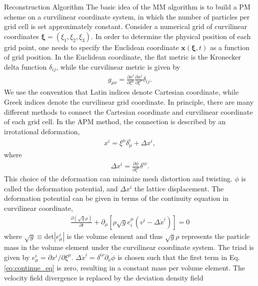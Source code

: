 \begin{section}{Reconstruction Algorithm}
  \label{sec:reconstruction}
The basic idea of the MM algorithm is to build a PM scheme on a curvilinear 
coordinate system, in which the number of particles per grid cell is 
set approximately constant. 
Consider a numerical grid of curvilinear coordinates 
$\bm{\xi}=\left(\xi_1,\xi_2,\xi_3\right)$. 
In order to determine the physical position of each grid point, one needs to 
specify the Euclidean coordinate $\bm{x}(\bm{\xi},t)$ as a function of grid 
position. In the Euclidean coordinate, the flat metric is the Kronecker 
delta function $\delta_{ij}$, while the curvilinear metric is given by
\begin{align}
    g_{\mu\nu}=\frac{\partial x^i}{\partial \xi ^\mu} \frac{\partial x^j}{\partial \xi ^\nu}\delta_{ij}.
\end{align}
We use the convention that Latin indices denote Cartesian coordinate, 
while Greek indices denote the curvilinear grid coordinate.
In principle, there are many different methods to connect the Cartesian 
coordinate and curvilinear coordinate of each grid cell. In the APM method, 
the connection is described by an irrotational deformation,
\begin{align}
    x^i=\xi ^\mu \delta ^i _\mu + \Delta x^i,
\end{align}
where
\begin{align}
 \label{eq:disp}
    \Delta x^i=\frac{\partial \phi}{\partial \xi ^ \nu}\delta ^{i \nu} .
\end{align}
This choice of the deformation can minimize mesh distortion and twisting. 
$\phi$ is called the deformation potential, and $\Delta x^i$ the lattice 
displacement. 
The deformation potential can be given in terms of the continuity equation 
in curvilinear coordinate,
\begin{align}
 \label{eq:continue_eq}
    \frac{\partial (\sqrt{g} \rho) }{\partial t}+\partial_\mu \left[\rho \sqrt{g} e^\mu _i \left(v^i - \Delta \dot{x}^i \right) \right] =0
\end{align}
where $\sqrt{g} \equiv \mathrm{det}\left| e^i_\mu\right|$ is the volume element 
and thus $\sqrt{g} \rho$ represents the particle mass in the volume element under 
the curvilinear coordinate system. 
The triad is given by $e^i_\mu = \partial x^i / \partial \xi ^ \mu$. 
$\Delta \dot{x}^i=\delta ^{i\nu}\partial _\nu \dot{\phi}$ is chosen such that the 
first term in Eq.\ref{eq:continue_eq} is zero, resulting in a constant mass 
per volume element. 
The velocity field divergence is replaced by the deviation density field 

\end{section}

